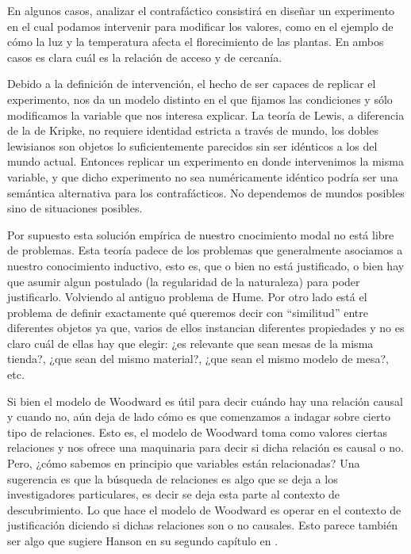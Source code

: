 {En algunos casos, analizar el contrafáctico consistirá en diseñar un experimento en el cual podamos intervenir para modificar los valores, como en el ejemplo de cómo la luz y la temperatura afecta el florecimiento de las plantas. En ambos casos es clara cuál es la relación de acceso y de cercanía.

Debido a la definición de intervención, el hecho de ser capaces de replicar el experimento, nos da un modelo distinto en el que fijamos las condiciones y sólo modificamos la variable que nos interesa explicar. La teoría de Lewis, a diferencia de la de Kripke, no requiere identidad estricta a través de mundo, los dobles lewisianos son objetos lo suficientemente parecidos sin ser idénticos a los del mundo actual. Entonces replicar un experimento en donde intervenimos la misma variable, y que dicho experimento no sea numéricamente idéntico podría ser una semántica alternativa para los contrafácticos. No dependemos de mundos posibles sino de situaciones posibles.

Por supuesto esta solución empírica de nuestro cnocimiento modal no está libre de problemas. Esta teoría padece de los problemas que generalmente asociamos a nuestro conocimiento inductivo, esto es, que o bien no está justificado, o bien hay que asumir algun postulado (la regularidad de la naturaleza) para poder justificarlo. Volviendo al antiguo problema de Hume. Por otro lado está el problema de definir exactamente qué queremos decir con ``similitud'' entre diferentes objetos ya que, varios de ellos instancian diferentes propiedades y no es claro cuál de ellas hay que elegir: ¿es relevante que sean mesas de la misma tienda?, ¿que sean del mismo material?, ¿que sean el mismo modelo de mesa?, etc.

Si bien el modelo de Woodward es útil para decir cuándo hay una relación causal y cuando no, aún deja de lado cómo es que comenzamos a indagar sobre cierto tipo de relaciones. Esto es, el modelo de Woodward toma como valores ciertas relaciones y nos ofrece una maquinaria para decir si dicha relación es causal o no. Pero, ¿cómo sabemos en principio que variables están relacionadas? Una sugerencia es que la búsqueda de relaciones es algo que se deja a los investigadores particulares, es decir se deja esta parte al contexto de descubrimiento. Lo que hace el modelo de Woodward es operar en el contexto de justificación diciendo si dichas relaciones son o no causales. Esto parece también ser algo que sugiere Hanson en su segundo capítulo en \citeyear{Hanson1958}.

}
